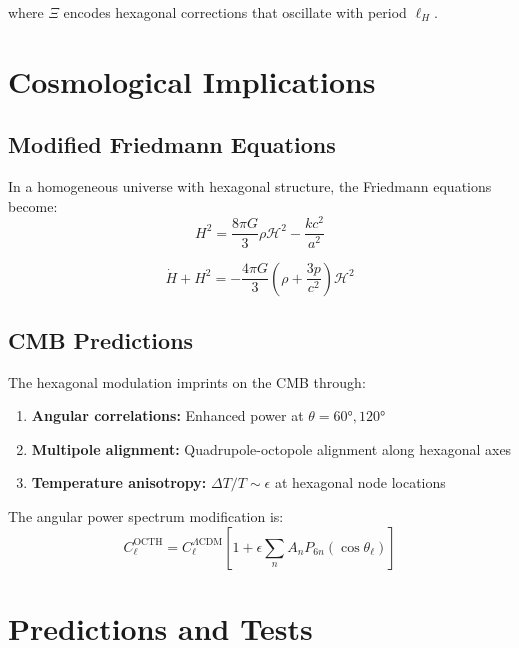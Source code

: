 \documentclass[12pt,a4paper]{article}
\begin{document}
where $\Xi$ encodes hexagonal corrections that oscillate with period $\ell_H$.

\section{Cosmological Implications}

\subsection{Modified Friedmann Equations}

In a homogeneous universe with hexagonal structure, the Friedmann equations become:
\begin{equation}
    H^2 = \frac{8\pi G}{3}\rho\mathcal{H}^2 - \frac{k c^2}{a^2}
\end{equation}

\begin{equation}
    \dot{H} + H^2 = -\frac{4\pi G}{3}\left(\rho + \frac{3p}{c^2}\right)\mathcal{H}^2
\end{equation}

\subsection{CMB Predictions}

The hexagonal modulation imprints on the CMB through:

\begin{enumerate}
    \item \textbf{Angular correlations:} Enhanced power at $\theta = 60°, 120°$
    \item \textbf{Multipole alignment:} Quadrupole-octopole alignment along hexagonal axes
    \item \textbf{Temperature anisotropy:} $\Delta T/T \sim \epsilon$ at hexagonal node locations
\end{enumerate}

The angular power spectrum modification is:
\begin{equation}
    C_\ell^{\text{OCTH}} = C_\ell^{\Lambda\text{CDM}}\left[1 + \epsilon \sum_n A_n P_{6n}(\cos\theta_\ell)\right]
\end{equation}

\section{Predictions and Tests}
\end{document}
